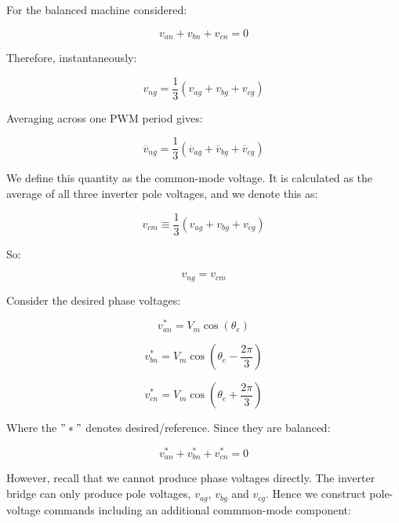 \documentclass{article}
\begin{document}
For the balanced machine considered:

\begin{equation}
    v_{an} + v_{bn} + v_{cn} = 0
\end{equation}

Therefore, instantaneously:

\begin{equation}
    v_{ng} = \frac{1}{3}(v_{ag} + v_{bg} + v_{cg})
\end{equation}

Averaging across one PWM period gives:

\begin{equation}
    \overline{v}_{ng} = \frac{1}{3}(\overline{v}_{ag} + \overline{v}_{bg} + \overline{v}_{cg})
\end{equation}

We define this quantity as the common-mode voltage. It is calculated as the average of all three inverter pole voltages, and we denote this as:

\begin{equation}
    v_{cm} \equiv \frac{1}{3}(v_{ag} + v_{bg} + v_{cg})
\end{equation}

So:

\begin{equation}
    v_{ng} = v_{cm}
\end{equation}

Consider the desired phase voltages:

\begin{equation}
    v_{an}^* = V_m\cos(\theta_e)
\end{equation}

\begin{equation}
    v_{bn}^* = V_m\cos(\theta_e - \frac{2\pi}{3})
\end{equation}

\begin{equation}
    v_{cn}^* = V_m\cos(\theta_e + \frac{2\pi}{3})
\end{equation}

Where the $"*"$ denotes desired/reference. Since they are balanced:

\begin{equation}
\label{eqn:balanced-desired}
    v_{an}^* + v_{bn}^* + v_{cn}^* = 0
\end{equation}

However, recall that we cannot produce phase voltages directly. The inverter bridge can only produce pole voltages, $v_{ag}$, $v_{bg}$ and $v_{cg}$. Hence we construct pole-voltage commands including an additional commmon-mode component:
\end{document}
